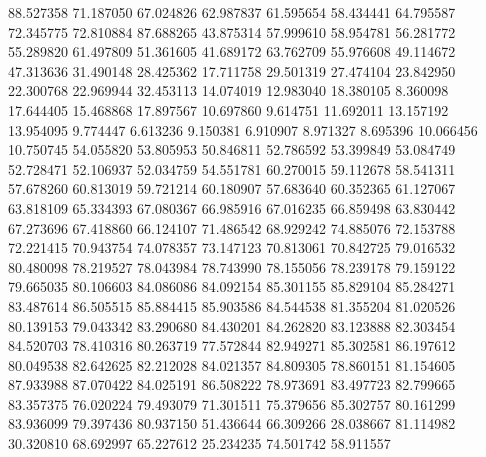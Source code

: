 88.527358
71.187050
67.024826
62.987837
61.595654
58.434441
64.795587
72.345775
72.810884
87.688265
43.875314
57.999610
58.954781
56.281772
55.289820
61.497809
51.361605
41.689172
63.762709
55.976608
49.114672
47.313636
31.490148
28.425362
17.711758
29.501319
27.474104
23.842950
22.300768
22.969944
32.453113
14.074019
12.983040
18.380105
8.360098
17.644405
15.468868
17.897567
10.697860
9.614751
11.692011
13.157192
13.954095
9.774447
6.613236
9.150381
6.910907
8.971327
8.695396
10.066456
10.750745
54.055820
53.805953
50.846811
52.786592
53.399849
53.084749
52.728471
52.106937
52.034759
54.551781
60.270015
59.112678
58.541311
57.678260
60.813019
59.721214
60.180907
57.683640
60.352365
61.127067
63.818109
65.334393
67.080367
66.985916
67.016235
66.859498
63.830442
67.273696
67.418860
66.124107
71.486542
68.929242
74.885076
72.153788
72.221415
70.943754
74.078357
73.147123
70.813061
70.842725
79.016532
80.480098
78.219527
78.043984
78.743990
78.155056
78.239178
79.159122
79.665035
80.106603
84.086086
84.092154
85.301155
85.829104
85.284271
83.487614
86.505515
85.884415
85.903586
84.544538
81.355204
81.020526
80.139153
79.043342
83.290680
84.430201
84.262820
83.123888
82.303454
84.520703
78.410316
80.263719
77.572844
82.949271
85.302581
86.197612
80.049538
82.642625
82.212028
84.021357
84.809305
78.860151
81.154605
87.933988
87.070422
84.025191
86.508222
78.973691
83.497723
82.799665
83.357375
76.020224
79.493079
71.301511
75.379656
85.302757
80.161299
83.936099
79.397436
80.937150
51.436644
66.309266
28.038667
81.114982
30.320810
68.692997
65.227612
25.234235
74.501742
58.911557
